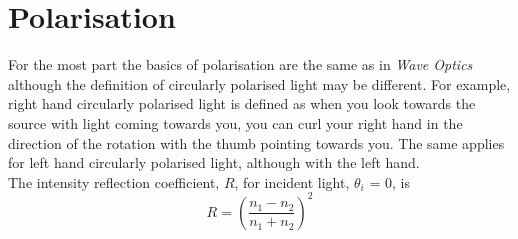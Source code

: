 \section{Polarisation}
For the most part the basics of polarisation are the same as in \textit{Wave Optics} although the definition of circularly polarised light may be different.
 For example, right hand circularly polarised light is defined as when you look towards the source with light coming towards you, you can curl your right hand in the direction of the rotation with the thumb pointing towards you. %
 The same applies for left hand circularly polarised light, although with the left hand.
 \\
 The intensity reflection coefficient, $R$, for incident light, $\theta_i$ = 0, is
 \begin{equation}
 R = \left(\frac{n_1-n_2}{n_1+n_2}\right)^2
 \end{equation}
 


